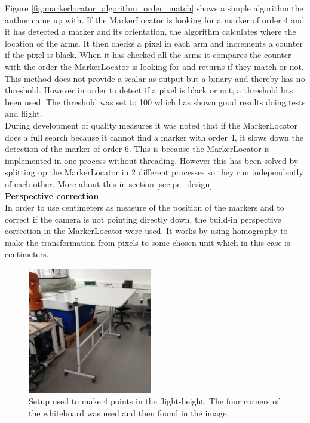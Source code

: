 Figure \ref{fig:markerlocator_algorithm_order_match} shows a simple algorithm the author came up with.
If the MarkerLocator is looking for a marker of order 4 and it has detected a marker and its orientation, the algorithm calculates where the location of the arms. It then checks a pixel in each arm and increments a counter if the pixel is black. When it has checked all the arms it compares the counter with the order the MarkerLocator is looking for and returns if they match or not. 
This method does not provide a scalar as output but a binary and thereby has no threshold. However in order to detect if a pixel is black or not, a threshold has been used. The threshold was set to 100 which has shown good results doing tests and flight. \\

During development of quality measures it was noted that if the MarkerLocator does a full search because it cannot find a marker with order 4, it slows down the detection of the marker of order 6. This is because the MarkerLocator is implemented in one process without threading. However this has been solved by splitting up the MarkerLocator in 2 different processes so they run independently of each other. More about this in section  \ref{sec:pc_design} \\

\textbf{Perspective correction} \\
In order to use centimeters as measure of the position of the markers and to correct if the camera is not pointing directly down, the build-in perspective correction in the MarkerLocator were used.
It works by using homography\cite{janeriksolem2012} to make the transformation from pixels to some chosen unit which in this case is centimeters.
\begin{figure}
  \vspace{-20pt}
  \begin{center}
    \includegraphics[width=0.48\textwidth]{graphics/whiteboard_tilted.jpg}
  \end{center}
  \vspace{-20pt}
  \caption{Setup used to make 4 points in the flight-height. The four corners of the whiteboard was used and then found in the image. } \label{fig:whiteboard_setup}
  \vspace{-10pt}
\end{figure}

